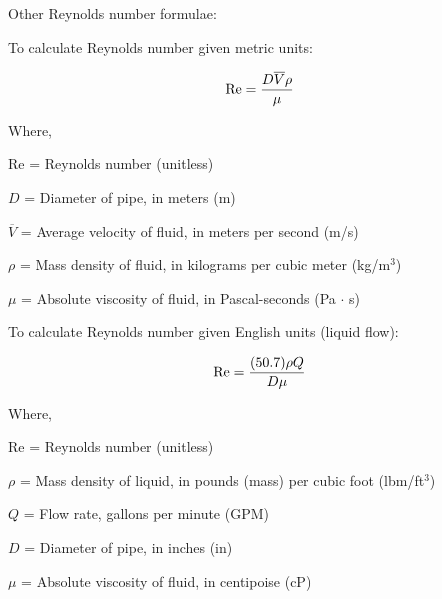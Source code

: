 





\noindent
Other Reynolds number formulae:

\vskip 10pt

To calculate Reynolds number given metric units:

$$\hbox{Re} = {{D \overline{V} \rho} \over \mu}$$

\noindent
Where,

Re = Reynolds number (unitless)

$D$ = Diameter of pipe, in meters (m)

$\overline{V}$ = Average velocity of fluid, in meters per second (m/s)

$\rho$ = Mass density of fluid, in kilograms per cubic meter (kg/m$^{3}$)

$\mu$ = Absolute viscosity of fluid, in Pascal-seconds (Pa $\cdot$ s)

\vskip 60pt \goodbreak

To calculate Reynolds number given English units (liquid flow):

$$\hbox{Re} = {{(50.7) \rho Q} \over {D \mu}}$$

\noindent
Where,

Re = Reynolds number (unitless)

$\rho$ = Mass density of liquid, in pounds (mass) per cubic foot (lbm/ft$^{3}$)

$Q$ = Flow rate, gallons per minute (GPM)

$D$ = Diameter of pipe, in inches (in)

$\mu$ = Absolute viscosity of fluid, in centipoise (cP)





